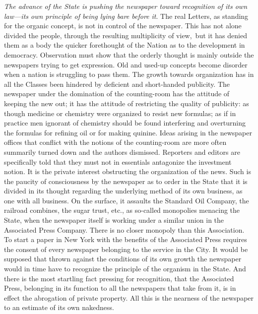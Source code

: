 \documentclass[twoside,symmetric,nobib,justified]{tufte-book}
\begin{document}
\vspace{0.05in}

\emph{The advance of the State is pushing the newspaper toward
recognition of its own law---its own principle of being lying bare
before it}. The real Letters, as standing for the organic concept, is
not in control of the newspaper. This has not alone divided the people,
through the resulting multiplicity of view,~but it has denied them as a
body the quicker forethought of the Nation as to the development in
democracy. Observation must show that the orderly thought is mainly
outside the newspapers trying to get expression. Old and used-up
concepts become disorder when a nation is struggling to pass them. The
growth towards organization has in all the Classes been hindered by
deficient and short-handed publicity. The newspaper under the domination
of the counting-room has the attitude of keeping the new out; it has the
attitude of restricting the quality of publicity: as though medicine or
chemistry were organized to resist new formulas; as if in practice men
ignorant of chemistry should be found interfering and overturning the
formulas for refining oil or for making quinine. Ideas arising in the
newspaper offices that conflict with the notions of the counting-room
are more often summarily turned down and the authors dismissed.
Reporters and editors are specifically told that they must not in
essentials antagonize the investment notion. It is the private interest
obstructing the organization of the news. Such is the paucity of
consciousness by the newspaper as to order in the State that it is
divided in its thought regarding the underlying method of its own
business, as one with all business. On the surface, it assaults the
Standard Oil Company, the railroad combines, the sugar trust, etc., as
so-called monopolies menacing the State, when the newspaper itself is
working under a similar union in the Associated Press Company. There is
no closer monopoly than this Association. To start a paper in New York
with the benefits of the Associated Press requires the consent of every
newspaper belonging to the service in the City. It would be supposed
that thrown against the conditions of its own growth the newspaper would
in time have to recognize the principle of the organism in the State.
And there is the most startling fact pressing for recognition, that the
Associated Press, belonging in its function to all the newspapers that
take from it, is in effect the abrogation of private property. All this
is the nearness of the newspaper to an estimate of its own nakedness.~
\end{document}
